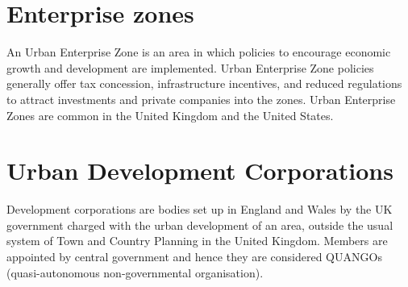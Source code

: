 \documentclass{article}
\begin{document}
	\section*{Enterprise zones}
	An Urban Enterprise Zone is an area in which policies to encourage economic
	growth and development are implemented.
	Urban Enterprise Zone policies generally offer tax concession, infrastructure incentives,
	and reduced regulations to attract investments and private companies into the zones.
	Urban Enterprise Zones are common in the United Kingdom and the United States.	
	
	\section*{Urban Development Corporations}
	Development corporations are bodies set up in England and Wales by the UK government charged
	with the urban development of an area, outside the usual system of Town and Country Planning
	in the United Kingdom. Members are appointed by central government and hence they are considered QUANGOs
	(quasi-autonomous non-governmental organisation).
	
\end{document}
